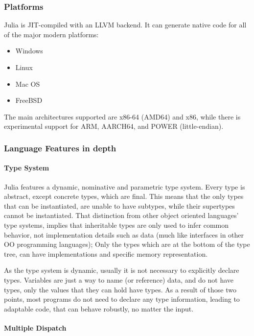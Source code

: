 \documentclass[11pt,a4paper,english,greek,twoside]{thesis}
\begin{document}
\subsubsection{Platforms}\label{platforms}

Julia is JIT-compiled with an LLVM backend. It can generate native code
for all of the major modern platforms:

\begin{itemize}
\tightlist
\item
  Windows
\item
  Linux
\item
  Mac OS
\item
  FreeBSD
\end{itemize}

The main architectures supported are x86-64 (AMD64) and x86, while there
is experimental support for ARM, AARCH64, and POWER (little-endian).

\subsubsection{Language Features in
depth}\label{language-features-in-depth}

\paragraph{Type System}\label{type-system}

Julia features a dynamic, nominative and parametric type system. Every
type is abstract, except concrete types, which are final. This means
that the only types that can be instantiated, are unable to have
subtypes, while their supertypes cannot be instantiated. That
distinction from other object oriented languages' type systems, implies
that inheritable types are only used to infer common behavior, not
implementation details such as data (much like interfaces in other OO
programming languages); Only the types which are at the bottom of the
type tree, can have implementations and specific memory representation.

As the type system is dynamic, usually it is not necessary to explicitly
declare types. Variables are just a way to name (or reference) data, and
do not have types, only the values that they can hold have types. As a
result of those two points, most programs do not need to declare any
type information, leading to adaptable code, that can behave robustly,
no matter the input.

\paragraph{Multiple Dispatch}\label{multiple-dispatch}
\end{document}
